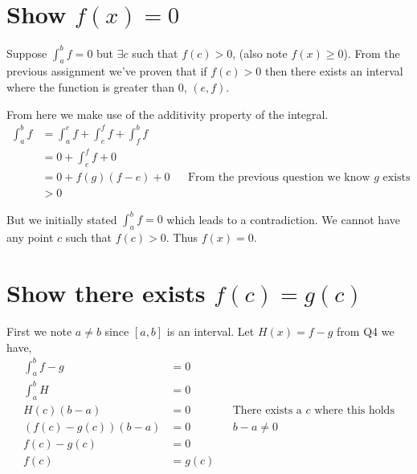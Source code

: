 \documentclass{article}
\begin{document}
\section{Show $f(x) = 0$}
Suppose $\int_a^b f = 0$ but $\exists c$ such that $f(c) > 0$,
(also note $f(x) \geq 0$). From the
previous assignment we've proven that if $f(c) > 0$ then there exists an
interval where the function is greater than 0, $(e, f)$.

From here we make use of the additivity property of the integral.
\begin{align*}
    \int_a^b f &= \int_a^e f + \int_e^f f + \int_f^b f \\
    &= 0 + \int_e^f f + 0 \\
    &= 0 + f(g)(f-e) + 0
    && \text{From the previous question we know $g$ exists} \\
    &> 0
\end{align*}

But we initially stated $\int_a^b f = 0$ which leads to a contradiction. We
cannot have any point $c$ such that $f(c) > 0$. Thus $f(x) = 0$.

\section{Show there exists $f(c) = g(c)$}
First we note $a \neq b$ since $[a,b]$ is an interval.
Let $H(x) = f - g$ from Q4 we have,
\begin{align*}
    \int_a^b f - g &= 0 \\
    \int_a^b H &= 0 \\
    H(c)(b - a) &= 0 && \text{There exists a $c$ where this holds} \\
    (f(c) - g(c))(b - a) &= 0 && \text{$b - a \neq 0$} \\
    f(c) - g(c) &= 0 \\
    f(c) &= g(c) \\
\end{align*}
\end{document}
